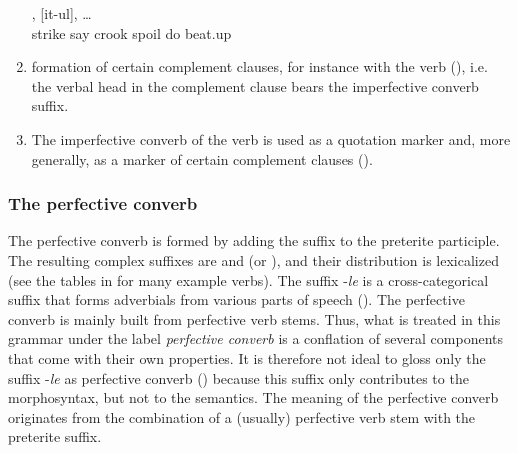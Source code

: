 \begin{enumerate}
\begin{exe}
		\ex	\label{ex:‎‎hitting with the crook, disturbing, beating up}
		,	[it-ul], \ldots\\
			strike	say	crook	spoil	do		beat.up\\
		\glt	{}
	\end{exe}

	\item	formation of certain complement clauses, for instance with the verb  (), i.e. the verbal head in the complement clause bears the imperfective converb suffix.

	\item	The imperfective converb of the verb   is used as a quotation marker and, more generally, as a marker of certain complement clauses ().

\end{enumerate}


\subsubsection{The perfective converb}
\label{sssec:The perfective converb}

The perfective converb is formed by adding the suffix  to the preterite participle. The resulting complex suffixes are  and  (or ), and their distribution is lexicalized (see the tables in  for many example verbs). The suffix -\textit{le} is a cross-categorical suffix that forms adverbials from various parts of speech (). The perfective converb is mainly built from perfective verb stems. Thus, what is treated in this grammar under the label \textit{perfective converb} is a conflation of several components that come with their own properties. It is therefore not ideal to gloss only the suffix -\textit{le} as perfective converb () because this suffix only contributes to the morphosyntax, but not to the semantics. The meaning of the perfective converb originates from the combination of a (usually) perfective verb stem with the preterite suffix.


